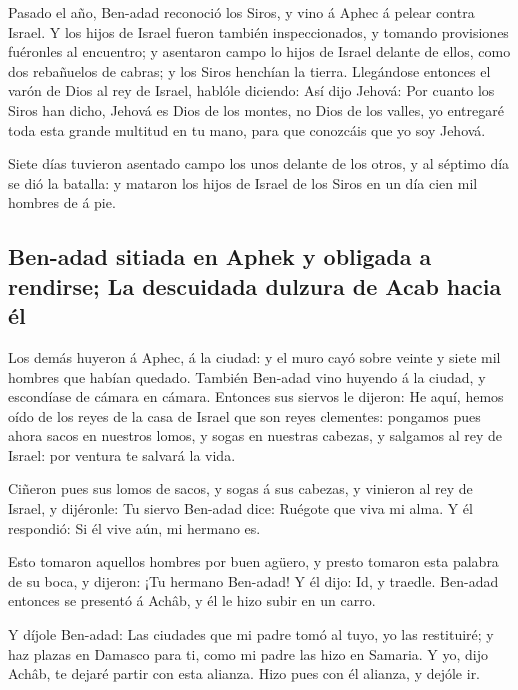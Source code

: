  Pasado el año, Ben-adad reconoció los Siros, y vino á
Aphec á pelear contra Israel.  Y los hijos de Israel fueron
también inspeccionados, y tomando provisiones fuéronles al encuentro; y
asentaron campo lo hijos de Israel delante de ellos, como dos rebañuelos
de cabras; y los Siros henchían la tierra.  Llegándose
entonces el varón de Dios al rey de Israel, hablóle diciendo: Así dijo
Jehová: Por cuanto los Siros han dicho, Jehová es Dios de los montes, no
Dios de los valles, yo entregaré toda esta grande multitud en tu mano,
para que conozcáis que yo soy Jehová.

 Siete días tuvieron asentado campo los unos delante de los
otros, y al séptimo día se dió la batalla: y mataron los hijos de Israel
de los Siros en un día cien mil hombres de á pie.

\hypertarget{ben-adad-sitiada-en-aphek-y-obligada-a-rendirse-la-descuidada-dulzura-de-acab-hacia-uxe9l}{%
\subsection{Ben-adad sitiada en Aphek y obligada a rendirse; La
descuidada dulzura de Acab hacia
él}\label{ben-adad-sitiada-en-aphek-y-obligada-a-rendirse-la-descuidada-dulzura-de-acab-hacia-uxe9l}}

 Los demás huyeron á Aphec, á la ciudad: y el muro cayó
sobre veinte y siete mil hombres que habían quedado. También Ben-adad
vino huyendo á la ciudad, y escondíase de cámara en cámara.
 Entonces sus siervos le dijeron: He aquí, hemos oído de
los reyes de la casa de Israel que son reyes clementes: pongamos pues
ahora sacos en nuestros lomos, y sogas en nuestras cabezas, y salgamos
al rey de Israel: por ventura te salvará la vida.

 Ciñeron pues sus lomos de sacos, y sogas á sus cabezas, y
vinieron al rey de Israel, y dijéronle: Tu siervo Ben-adad dice: Ruégote
que viva mi alma. Y él respondió: Si él vive aún, mi hermano es.

 Esto tomaron aquellos hombres por buen agüero, y presto
tomaron esta palabra de su boca, y dijeron: ¡Tu hermano Ben-adad! Y él
dijo: Id, y traedle. Ben-adad entonces se presentó á Achâb, y él le hizo
subir en un carro.

 Y díjole Ben-adad: Las ciudades que mi padre tomó al tuyo,
yo las restituiré; y haz plazas en Damasco para ti, como mi padre las
hizo en Samaria. Y yo, dijo Achâb, te dejaré partir con esta alianza.
Hizo pues con él alianza, y dejóle ir.

